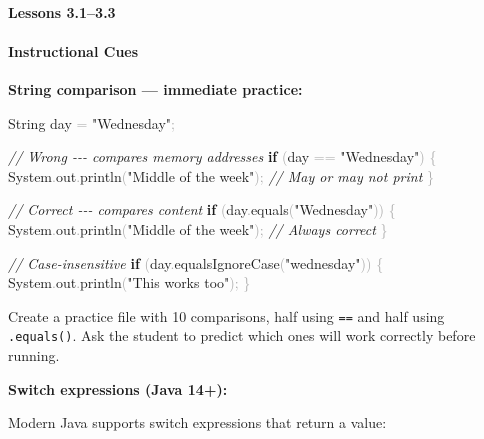 \documentclass[
  justified,
  openright,
]{tufte-book}
\let\subsection\paragraph
\let\paragraph\paragraph
\newcommand{\KeywordTok}[1]{\textcolor{CodeKeyword}{\textbf{#1}}}  %
\newcommand{\StringTok}[1]{\textcolor{CodeString}{#1}}              %
\newcommand{\CommentTok}[1]{\textcolor{CodeComment}{\textit{#1}}}  %
\newcommand{\CodeFuncTok}[1]{\textcolor{CodeKeyword}{#1}}           %
\newcommand{\OperatorTok}[1]{\textcolor{DarkGray}{#1}}              %
\newenvironment{Shaded}{%
  \begin{mdframed}[style=TufteCode]%
}{%
  \end{mdframed}%
}
\let\subsection\paragraph
\let\paragraph\paragraph
\begin{document}
\subsection{Lessons 3.1--3.3}\label{lessons-3.13.3-1}

\paragraph{Instructional Cues}\label{instructional-cues-25}

\textbf{String comparison --- immediate practice:}

\begin{Shaded}
\begin{Highlighting}[]
String day \OperatorTok{=} \StringTok{"Wednesday"}\OperatorTok{;}
 
\CommentTok{// Wrong {-}{-}{-} compares memory addresses}
\KeywordTok{if} \OperatorTok{(}day \OperatorTok{==} \StringTok{"Wednesday"}\OperatorTok{)} \OperatorTok{\{}
    System\OperatorTok{.}\CodeFuncTok{out}\OperatorTok{.}\CodeFuncTok{println}\OperatorTok{(}\StringTok{"Middle of the week"}\OperatorTok{);}  \CommentTok{// May or may not print}
\OperatorTok{\}}
 
\CommentTok{// Correct {-}{-}{-} compares content}
\KeywordTok{if} \OperatorTok{(}day\OperatorTok{.}\CodeFuncTok{equals}\OperatorTok{(}\StringTok{"Wednesday"}\OperatorTok{))} \OperatorTok{\{}
    System\OperatorTok{.}\CodeFuncTok{out}\OperatorTok{.}\CodeFuncTok{println}\OperatorTok{(}\StringTok{"Middle of the week"}\OperatorTok{);}  \CommentTok{// Always correct}
\OperatorTok{\}}
 
\CommentTok{// Case{-}insensitive}
\KeywordTok{if} \OperatorTok{(}day\OperatorTok{.}\CodeFuncTok{equalsIgnoreCase}\OperatorTok{(}\StringTok{"wednesday"}\OperatorTok{))} \OperatorTok{\{}
    System\OperatorTok{.}\CodeFuncTok{out}\OperatorTok{.}\CodeFuncTok{println}\OperatorTok{(}\StringTok{"This works too"}\OperatorTok{);}
\OperatorTok{\}}
\end{Highlighting}
\end{Shaded}

Create a practice file with 10 comparisons, half using \texttt{==} and
half using \texttt{.equals()}. Ask the student to predict which ones
will work correctly before running.

\textbf{Switch expressions (Java 14+):}

Modern Java supports switch expressions that return a value:
\end{document}
